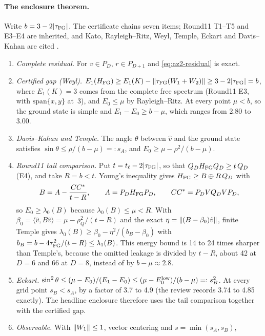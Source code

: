 \paragraph{The enclosure theorem.}
Write $b=3-2|\tau_{\mathrm{FG}}|$. The certificate chains seven items; Round11 T1--T5 and
E3--E4 are inherited, and Kato, Rayleigh--Ritz, Weyl, Temple, Eckart and
Davis--Kahan are cited \cite{standard}.
\begin{enumerate}[label=\arabic*.]
\item \emph{Complete residual.} For $v\in P_D$, $r\in P_{D+1}$ and
 \eqref{eq:az2-residual} is exact.
\item \emph{Certified gap (Weyl).}
 $E_1(H_{\rm FG})\ge E_1(K)-\left\lVert\tau_{\mathrm{FG}}(W_1+W_2)\right\rVert\ge3-2|\tau_{\mathrm{FG}}|=b$, where
 $E_1(K)=3$ comes from the complete free spectrum (Round11 E3, with
 $\mathrm{span}\{x,y\}$ at~3), and $E_0\le\mu$ by Rayleigh--Ritz. At every
 point $\mu<b$, so the ground state is simple and $E_1-E_0\ge b-\mu$, which
 ranges from 2.80 to 3.00.
\item \emph{Davis--Kahan and Temple.} The angle $\theta$ between $\hat v$ and
 the ground state satisfies $\sin\theta\le\rho/(b-\mu)=:s_A$, and
 $E_0\ge\mu-\rho^2/(b-\mu)$.
\item \emph{Round11 tail comparison.} Put $t=t_\ell-2|\tau_{\mathrm{FG}}|$, so that
 $Q_DH_{\rm FG}Q_D\ge t\,Q_D$ (E4), and take $R=b<t$. Young's inequality gives
 $H_{\rm FG}\ge B\oplus R\,Q_D$ with
 \begin{equation}
  B=A-\frac{CC^*}{t-R},\qquad A=P_DH_{\rm FG}P_D,\qquad CC^*=P_DVQ_DVP_D,
  \label{eq:az2-schur}
 \end{equation}
 so $E_0\ge\lambda_0(B)$ because $\lambda_0(B)\le\mu<R$. With
 $\beta_0=\langle\hat v,B\hat v\rangle=\mu-\rho_Q^2/(t-R)$ and the exact
 $\eta=\left\lVert(B-\beta_0)\hat v\right\rVert$, finite Temple gives
 $\lambda_0(B)\ge\beta_0-\eta^2/(b_B-\beta_0)$ with
 $b_B=b-4\tau_{\mathrm{FG}}^2/(t-R)\le\lambda_1(B)$. This energy bound is 14 to 24 times
 sharper than Temple's, because the omitted leakage is divided by $t-R$,
 about 42 at $D=6$ and 66 at $D=8$, instead of by $b-\mu\approx2.8$.
\item \emph{Eckart.}
 $\sin^2\theta\le(\mu-E_0)/(E_1-E_0)\le(\mu-E_0^{\rm low})/(b-\mu)=:s_B^2$.
 At every grid point $s_B<s_A$, by a factor of 3.7 to 4.9 (the review records
 3.74 to 4.85 exactly). The headline enclosure therefore uses the tail
 comparison together with the certified gap.
\item \emph{Observable.} With $\left\lVert W_1\right\rVert\le1$, vector centering and
 $s=\min(s_A,s_B)$,
 \begin{equation}

\end{equation}
\end{enumerate}
